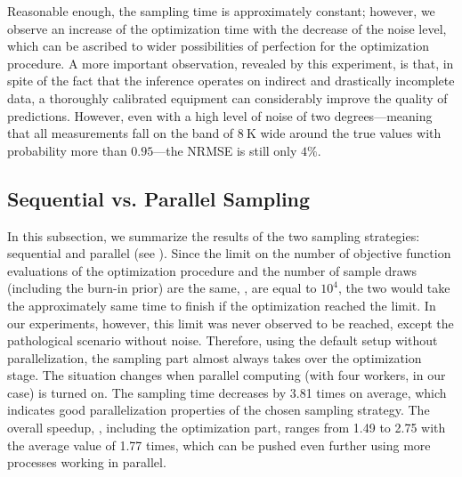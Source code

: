 Reasonable enough, the sampling time is approximately constant; however, we observe an increase of the optimization time with the decrease of the noise level, which can be ascribed to wider possibilities of perfection for the optimization procedure.
A more important observation, revealed by this experiment, is that, in spite of the fact that the inference operates on indirect and drastically incomplete data, a thoroughly calibrated equipment can considerably improve the quality of predictions.
However, even with a high level of noise of two degrees---meaning that all measurements fall on the band of $8~\text{K}$ wide around the true values with probability more than $0.95$---the NRMSE is still only $4\%$.

\subsection{Sequential vs. Parallel Sampling}
In this subsection, we summarize the results of the two sampling strategies: sequential and parallel (see ).
Since the limit on the number of objective function evaluations of the optimization procedure and the number of sample draws (including the burn-in prior) are the same, \ie, are equal to $10^4$, the two would take the approximately same time to finish if the optimization reached the limit. In our experiments, however, this limit was never observed to be reached, except the pathological scenario without noise.
Therefore, using the default setup without parallelization, the sampling part almost always takes over the optimization stage. The situation changes when parallel computing (with four workers, in our case) is turned on. The sampling time decreases by 3.81 times on average, which indicates good parallelization properties of the chosen sampling strategy.
The overall speedup, \ie, including the optimization part, ranges from 1.49 to 2.75 with the average value of 1.77 times, which can be pushed even further using more processes working in parallel.
